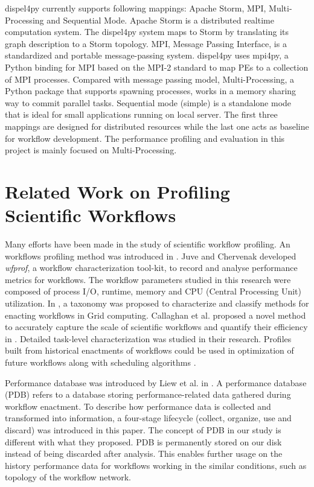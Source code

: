 \documentclass[10pt,twoside,openright,logo]{report}
\begin{document}
dispel4py currently supports following mappings: Apache Storm, MPI, Multi-Processing and Sequential Mode.
Apache Storm is a distributed realtime computation system. The dispel4py system maps to Storm by translating its graph description to a Storm topology.
MPI, Message Passing Interface, is a standardized and portable message-passing system. dispel4py uses mpi4py, a Python binding for MPI based on the MPI-2 standard to map PEs to a collection of MPI processes.
Compared with message passing model, Multi-Processing, a Python package that supports spawning processes, works in a memory sharing way to commit parallel tasks.
Sequential mode (simple) is a standalone mode that is ideal for small applications running on local server.
The first three mappings are designed for distributed resources while the last one acts as baseline for workflow development.
The performance profiling and evaluation in this project is mainly focused on Multi-Processing.

\section{Related Work on Profiling Scientific Workflows}
Many efforts have been made in the study of scientific workflow profiling. An workflows profiling method was introduced in \cite{5}. Juve and Chervenak developed \textit{wfprof}, a workflow characterization tool-kit, to record and analyse performance metrics for workflows. The workflow parameters studied in this research were composed of process I/O, runtime, memory and CPU (Central Processing Unit) utilization. In \cite{2}, a taxonomy was proposed to characterize and classify methods for enacting workflows in Grid computing. Callaghan et al. proposed a novel method to accurately capture the scale of scientific workflows and quantify their efficiency in \cite{4}. Detailed task-level characterization was studied in their research. Profiles built from historical enactments of workflows could be used in optimization of future workflows along with scheduling algorithms \cite{6}.

Performance database was introduced by Liew et al. in \cite{7}. A performance database (PDB) refers to a database storing performance-related data gathered during workflow enactment. To describe how performance data is collected and transformed into information, a four-stage lifecycle (collect, organize, use and discard) was introduced in this paper. The concept of PDB in our study is different with what they proposed. PDB is permanently stored on our disk instead of being discarded after analysis. This enables further usage on the history performance data for workflows working in the similar conditions, such as topology of the workflow network.
\end{document}
